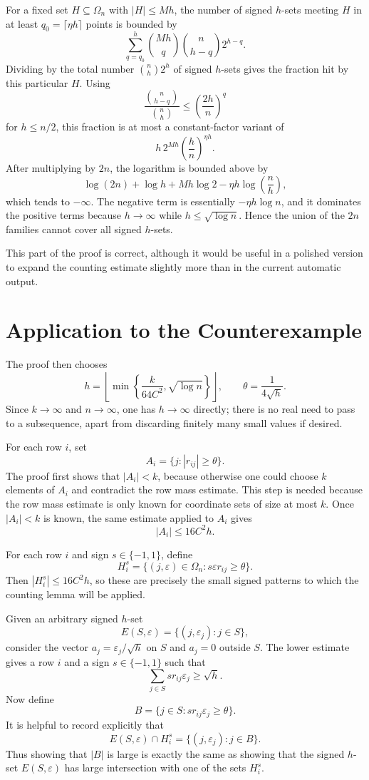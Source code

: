 \documentclass[11pt]{article}
\begin{document}
For a fixed set \(H\subseteq \Omega_n\) with \(|H|\leq Mh\), the number of
signed \(h\)-sets meeting \(H\) in at least \(q_0=\lceil \eta h\rceil\)
points is bounded by
\[
  \sum_{q=q_0}^h
  \binom{Mh}{q}\binom{n}{h-q}2^{h-q}.
\]
Dividing by the total number \(\binom nh2^h\) of signed \(h\)-sets gives the
fraction hit by this particular \(H\).  Using
\[
  \frac{\binom{n}{h-q}}{\binom nh}
  \leq
  \left(\frac{2h}{n}\right)^q
\]
for \(h\leq n/2\), this fraction is at most a constant-factor variant of
\[
  h\,2^{Mh}\left(\frac{h}{n}\right)^{\eta h}.
\]
After multiplying by \(2n\), the logarithm is bounded above by
\[
  \log(2n)+\log h+Mh\log 2
  -
  \eta h\log\left(\frac nh\right),
\]
which tends to \(-\infty\).  The negative term is essentially
\(-\eta h\log n\), and it dominates the positive terms because
\(h\to\infty\) while \(h\leq \sqrt{\log n}\).  Hence the union of the \(2n\)
families cannot cover all signed \(h\)-sets.

This part of the proof is correct, although it would be useful in a polished
version to expand the counting estimate slightly more than in the current
automatic output.

\section*{Application to the Counterexample}

The proof then chooses
\[
  h=
  \left\lfloor
  \min\left\{\frac{k}{64C^2},\sqrt{\log n}\right\}
  \right\rfloor,
  \qquad
  \theta=\frac{1}{4\sqrt h}.
\]
Since \(k\to\infty\) and \(n\to\infty\), one has \(h\to\infty\) directly;
there is no real need to pass to a subsequence, apart from discarding
finitely many small values if desired.

For each row \(i\), set
\[
  A_i=\{j: |r_{ij}|\geq \theta\}.
\]
The proof first shows that \(|A_i|<k\), because otherwise one could choose
\(k\) elements of \(A_i\) and contradict the row mass estimate.  This step is
needed because the row mass estimate is only known for coordinate sets of
size at most \(k\).  Once \(|A_i|<k\) is known, the same estimate applied to
\(A_i\) gives
\[
  |A_i|\leq 16C^2h.
\]

For each row \(i\) and sign \(s\in\{-1,1\}\), define
\[
  H_i^s
  =
  \{ (j,\varepsilon)\in\Omega_n:
      s\varepsilon r_{ij}\geq \theta \}.
\]
Then \(|H_i^s|\leq 16C^2h\), so these are precisely the small signed patterns
to which the counting lemma will be applied.

Given an arbitrary signed \(h\)-set
\[
  E(S,\varepsilon)=\{(j,\varepsilon_j):j\in S\},
\]
consider the vector \(a_j=\varepsilon_j/\sqrt h\) on \(S\) and \(a_j=0\)
outside \(S\).  The lower estimate gives a row \(i\) and a sign
\(s\in\{-1,1\}\) such that
\[
  \sum_{j\in S}s r_{ij}\varepsilon_j\geq \sqrt h.
\]
Now define
\[
  B=\{j\in S: s r_{ij}\varepsilon_j\geq \theta\}.
\]
It is helpful to record explicitly that
\[
  E(S,\varepsilon)\cap H_i^s
  =
  \{(j,\varepsilon_j):j\in B\}.
\]
Thus showing that \(|B|\) is large is exactly the same as showing that the
signed \(h\)-set \(E(S,\varepsilon)\) has large intersection with one of the
sets \(H_i^s\).
\end{document}
